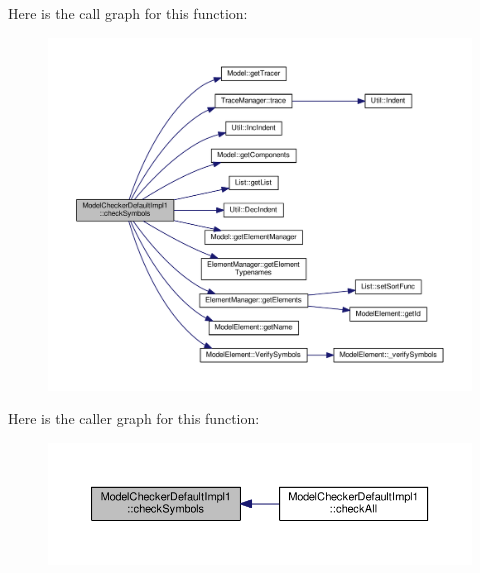 Here is the call graph for this function\+:\nopagebreak
\begin{figure}[H]
\begin{center}
\leavevmode
\includegraphics[width=350pt]{class_model_checker_default_impl1_a2088315a12f9cc019306427e439541c6_cgraph}
\end{center}
\end{figure}




Here is the caller graph for this function\+:\nopagebreak
\begin{figure}[H]
\begin{center}
\leavevmode
\includegraphics[width=350pt]{class_model_checker_default_impl1_a2088315a12f9cc019306427e439541c6_icgraph}
\end{center}
\end{figure}


